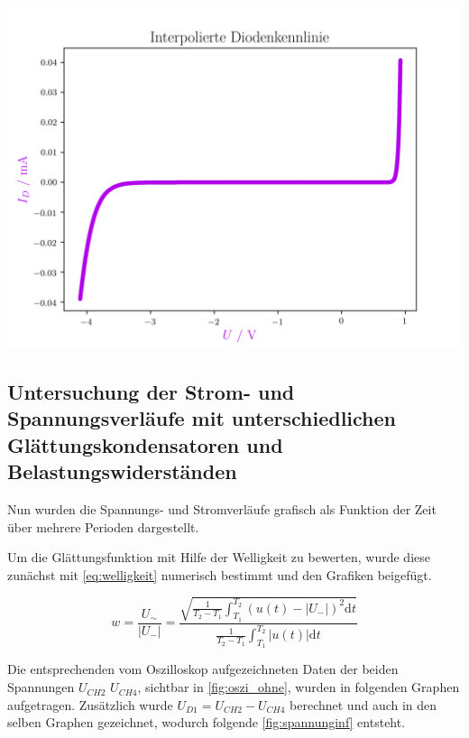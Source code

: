 \documentclass[11pt,ngerman]{scrartcl}
\begin{document}
\begin{center}
	\begin{minipage}[t]{0.8\textwidth}
		\includegraphics[width=\textwidth]{./figures/halbleiter/Versuch2/diodenkennlinie.png}
		\label{fig:diodenkennlinie}
	\end{minipage}
\end{center}

\newpage

\subsection{Untersuchung der Strom- und Spannungsverläufe mit unterschiedlichen Glättungskondensatoren und Belastungswiderständen}

Nun wurden die Spannungs- und Stromverläufe grafisch als Funktion der Zeit
über mehrere Perioden dargestellt.

Um die Glättungsfunktion mit Hilfe der Welligkeit zu bewerten, wurde diese zunächst mit \autoref{eq:welligkeit} numerisch bestimmt und
den Grafiken beigefügt.

\begin{equation}
	w = \frac{U_{\sim}}{|U_{-}|} =\frac{\sqrt{\frac{1}{T_2-T_1}\int_{T_1}^{T_2}(u(t)-|U_{-}|)^2 \mathrm{d}t}}{\frac{1}{T_2-T_1}\int_{T_1}^{T_2}|u(t)|\mathrm{d}t}
	\label{eq:welligkeit}
\end{equation}

Die entsprechenden vom Oszilloskop aufgezeichneten Daten der beiden Spannungen $U_{CH2}$ $U_{CH4}$, sichtbar in \autoref{fig:oszi_ohne}, wurden in folgenden Graphen aufgetragen. Zusätzlich wurde $U_{D1}=U_{CH2}-U_{CH4}$ berechnet und auch in den selben Graphen gezeichnet, wodurch folgende \autoref{fig:spannunginf} entsteht.
\end{document}
